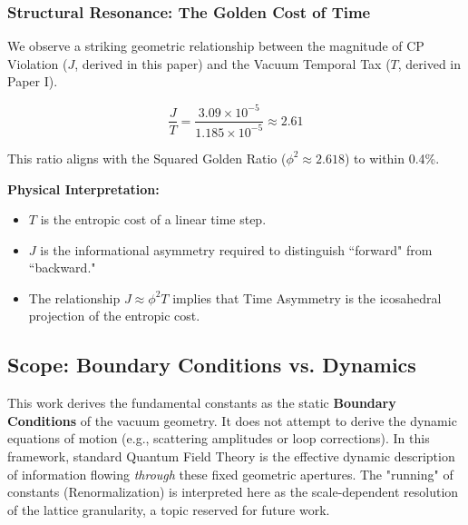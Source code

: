 \subsubsection{Structural Resonance: The Golden Cost of Time}

We observe a striking geometric relationship between the magnitude of CP Violation ($J$, derived in this paper) and the Vacuum Temporal Tax ($T$, derived in Paper I).

\begin{equation}
\frac{J}{T} = \frac{3.09 \times 10^{-5}}{1.185 \times 10^{-5}} \approx \mathbf{2.61}
\end{equation}

This ratio aligns with the Squared Golden Ratio ($\phi^2 \approx 2.618$) to within 0.4\%.

\textbf{Physical Interpretation:}
\begin{itemize}
    \item $T$ is the entropic cost of a linear time step.
    \item $J$ is the informational asymmetry required to distinguish ``forward" from ``backward."
    \item The relationship $J \approx \phi^2 T$ implies that Time Asymmetry is the icosahedral projection of the entropic cost.
\end{itemize}

\subsection{Scope: Boundary Conditions vs. Dynamics}
This work derives the fundamental constants as the static \textbf{Boundary Conditions} of the vacuum geometry. It does not attempt to derive the dynamic equations of motion (e.g., scattering amplitudes or loop corrections). In this framework, standard Quantum Field Theory is the effective dynamic description of information flowing \textit{through} these fixed geometric apertures. The "running" of constants (Renormalization) is interpreted here as the scale-dependent resolution of the lattice granularity, a topic reserved for future work.